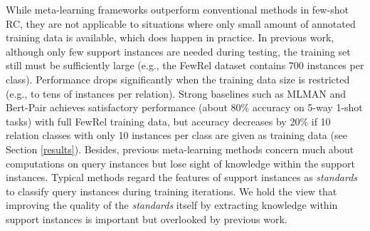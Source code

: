 While meta-learning frameworks outperform conventional methods in few-shot RC, 
they are not applicable to situations where only small amount of annotated training data is available, which does happen in practice.
In previous work, although only few support instances are needed during testing, the training set still must be sufficiently large (e.g., the FewRel dataset \cite{han-etal-2018-fewrel} contains 700 instances per class). Performance drops significantly when the training data size is restricted
(e.g., to tens of instances per relation). Strong baselines such as MLMAN \cite{ye-ling-2019-multi} and Bert-Pair \cite{gao-etal-2019-fewrel} achieves satisfactory performance (about 80\% accuracy on 5-way 1-shot tasks) with full FewRel training data, but accuracy decreases by 20\% if 10 relation classes with only 10 instances per class are given as training data (see Section \ref{results}).
Besides, previous meta-learning methods concern much about computations on query instances but lose sight of knowledge within the support instances.
Typical methods regard the features of support instances as \emph{standards} to classify query instances during training iterations.
We hold the view that improving the quality of the \emph{standards} itself
by extracting knowledge within support instances is important but
overlooked by previous work.

